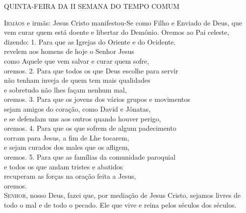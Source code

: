 \documentclass{book}
\begin{document}
\pagestyle{empty}
\begin{center}
    \large{QUINTA-FEIRA DA II SEMANA DO TEMPO COMUM}
    \vspace{.2cm} \\
\end{center}
\lettrine[findent=2pt]{\color{VioletRed1}I}{rmãos} e irmãs:
\newline
Jesus Cristo manifestou-Se como Filho e Enviado de Deus,
\newline
que vem curar quem está doente e libertar do Demônio.
\newline
Oremos ao Pai celeste, dizendo:
\vspace{.2cm}
\newline
{}
\vspace{.2cm}
\newline
{\color{VioletRed1} 1.} Para que as Igrejas do Oriente e do Ocidente.\\
revelem aos homens de hoje o Senhor Jesus\\
como Aquele que vem salvar e curar quem sofre,\\
oremos.
\vspace{.1cm}
\newline
{\color{VioletRed1} 2.} Para que todos os que Deus escolhe para servir\\
não tenham inveja de quem tem mais qualidades\\
e sobretudo não lhes façam nenhum mal,\\
oremos.
\vspace{.1cm}
\newline
{\color{VioletRed1} 3.} Para que os jovens dos vários grupos e movimentos\\
sejam amigos do coração, como David e Jônatas,\\
e se defendam uns aos outros quando houver perigo,\\
oremos.
\vspace{.1cm}
\newline
{\color{VioletRed1} 4.} Para que os que sofrem de algum padecimento\\
corram para Jesus, a fim de Lhe tocarem,\\
e sejam curados dos males que os afligem,\\
oremos.
\vspace{.1cm}
\newline
{\color{VioletRed1} 5.} Para que as famílias da comunidade paroquial\\
e todos os que andam tristes e abatidos\\
recuperam as forças na oração feita a Jesus,\\
oremos.
\vspace{.1cm} \\
\lettrine[findent=2pt]{\color{VioletRed1}S}{enhor}, nosso Deus,
\newline
fazei que, por mediação de Jesus Cristo,
\newline
sejamos livres de todo o mal e de todo o pecado.
\newline
Ele que vive e reina pelos séculos dos séculos.
\newline
{}
\end{document}
